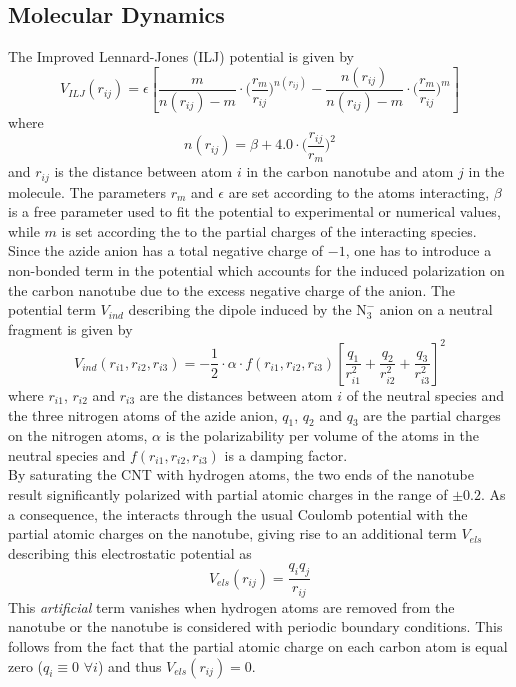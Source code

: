\documentclass[utf8]{article}
\begin{document}
\subsection{Molecular Dynamics}
The Improved Lennard-Jones (ILJ) potential\cite{Pirani2008} is given by
%
\begin{equation}\label{eq:V_ILJ}
    V_{ILJ}(r_{ij}) = \epsilon \left[ \frac{m}{n(r_{ij})-m} \cdot \Big( \frac{r_m}{r_{ij}} \Big)^{n(r_{ij})} -
                                 \frac{n(r_{ij})}{n(r_{ij})-m} \cdot \Big( \frac{r_m}{r_{ij}} \Big)^{m} \right]
\end{equation}
%
where
%
\begin{equation}
    n(r_{ij}) = \beta + 4.0 \cdot \Big( \frac{r_{ij}}{r_m} \Big)^2
\end{equation}
%
and $r_{ij}$ is the distance between atom $i$ in the carbon nanotube and atom $j$ in the \ntm
molecule. The parameters $r_m$ and $\epsilon$ are set according to the atoms interacting,
$\beta$ is a free parameter used to fit the potential to experimental or numerical values,
while $m$ is set according the to the partial charges of the interacting species.
Since the azide anion has a total negative charge of $-1$, one has to introduce a non-bonded term in the potential which accounts for the induced polarization on the carbon nanotube due to the excess negative charge of the anion.
The potential term $V_{ind}$ describing the dipole induced by the $\text{N}_3^-$ anion on a neutral fragment is given by
%
\begin{equation}\label{eq:V_ind}
    V_{ind}(r_{i1},r_{i2},r_{i3}) = - \frac{1}{2} \cdot \alpha \cdot f(r_{i1},r_{i2},r_{i3})
        \left[ \frac{q_1}{r_{i1}^2} + \frac{q_2}{r_{i2}^2} + \frac{q_3}{r_{i3}^2} \right]^2
\end{equation}
%
where $r_{i1}$, $r_{i2}$ and $r_{i3}$ are the distances between atom $i$ of the neutral species and the three nitrogen atoms of the azide anion, $q_1$, $q_2$ and $q_3$ are the partial charges on the nitrogen atoms, $\alpha$ is the polarizability per volume of the atoms in the neutral species and $f(r_{i1},r_{i2},r_{i3})$ is a damping factor.\\  %
By saturating the CNT with hydrogen atoms, the two ends of the nanotube result significantly polarized with partial atomic charges in the range of $\pm 0.2$.
As a consequence, the \ntm interacts through the usual Coulomb potential with the partial atomic charges on the nanotube, giving rise to an additional term $V_{els}$ describing this electrostatic potential as
%
\begin{equation}
    V_{els}(r_{ij}) = \frac{q_i q_j}{r_{ij}}
\end{equation}
%
This \textit{artificial} term vanishes when hydrogen atoms are removed from the nanotube or the nanotube is considered with periodic boundary conditions. This follows from the fact that the partial atomic charge on each carbon atom is equal zero ($q_i \equiv 0$ $\forall i$) and thus $V_{els}(r_{ij}) = 0$.\\
\end{document}
